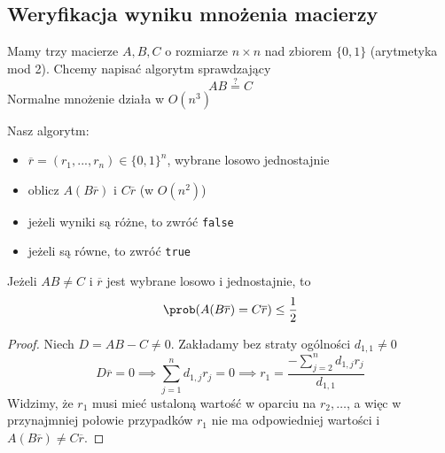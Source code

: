 \subsection{Weryfikacja wyniku mnożenia macierzy}
Mamy trzy macierze \(A, B, C\) o rozmiarze \(n \times n\) nad zbiorem \(\{0,1\}\) (arytmetyka mod 2). Chcemy napisać algorytm sprawdzający
\[
	AB \overset{?}{=} C
\]
Normalne mnożenie działa w \(O(n^3)\)

Nasz algorytm:
\begin{itemize}
	\item \(\overline{r} = (r_1, ..., r_n) \in \{0,1\}^n\), wybrane losowo jednostajnie
	\item oblicz \(A(B\overline{r})\) i \(C\overline{r}\) (w \(O(n^2)\))
	\item jeżeli wyniki są różne, to zwróć \texttt{false}
	\item jeżeli są równe, to zwróć \texttt{true}
\end{itemize}

Jeżeli \(AB \neq C\) i \(\overline{r}\) jest wybrane losowo i jednostajnie, to
\[
	\prob(A(B\overline{r}) = C\overline{r}) \leq \frac{1}{2}
\]

\begin{proof}
	Niech \(D = AB-C \neq 0\). Zakładamy bez straty ogólności \(d_{1,1} \neq 0\)
	\[
		D\overline{r} = 0 \implies \sum_{j=1}^n d_{1,j} r_j = 0 \implies r_1 = \frac{-\sum_{j=2}^n d_{1,j} r_j}{d_{1,1}}
	\]
	Widzimy, że \(r_1\) musi mieć ustaloną wartość w oparciu na \(r_2, \dots\), a więc w przynajmniej połowie przypadków \(r_1\) nie ma odpowiedniej wartości i \(A(B\overline{r}) \neq C\overline{r}\).
\end{proof}
